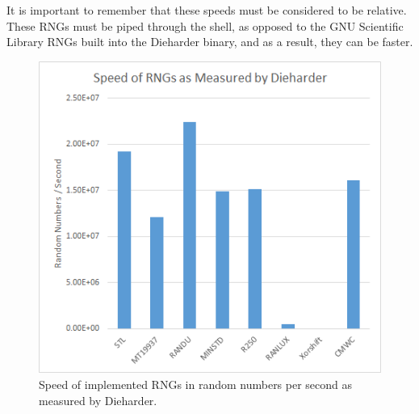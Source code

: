 It is important to remember that these speeds must be considered to be relative. These RNGs must be piped through the shell, as opposed to the GNU Scientific Library RNGs built into the Dieharder binary, and as a result, they can be faster.

\begin{figure}[tb]
    \begin{center}
        \includegraphics[width=\linewidth]{figures/speed.png}
    \end{center}
    \caption{Speed of implemented RNGs in random numbers per second as measured by Dieharder.}
    \label{fig:speed}
\end{figure}


